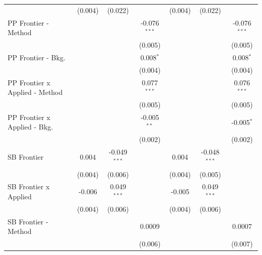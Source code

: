 \begin{tabular}{lcccccc}
                                  & (0.004)        & (0.022)        &                & (0.004)        & (0.022)        &   \\   
   PP Frontier - Method           &                &                & -0.076$^{***}$ &                &                & -0.076$^{***}$\\   
                                  &                &                & (0.005)        &                &                & (0.005)\\   
   PP Frontier - Bkg.             &                &                & 0.008$^{*}$    &                &                & 0.008$^{*}$\\   
                                  &                &                & (0.004)        &                &                & (0.004)\\   
   PP Frontier x Applied - Method &                &                & 0.077$^{***}$  &                &                & 0.076$^{***}$\\   
                                  &                &                & (0.005)        &                &                & (0.005)\\   
   PP Frontier x Applied - Bkg.   &                &                & -0.005$^{**}$  &                &                & -0.005$^{*}$\\   
                                  &                &                & (0.002)        &                &                & (0.002)\\   
   SB Frontier                    & 0.004          & -0.049$^{***}$ &                & 0.004          & -0.048$^{***}$ &   \\   
                                  & (0.004)        & (0.006)        &                & (0.004)        & (0.005)        &   \\   
   SB Frontier x Applied          & -0.006         & 0.049$^{***}$  &                & -0.005         & 0.049$^{***}$  &   \\   
                                  & (0.004)        & (0.006)        &                & (0.004)        & (0.006)        &   \\   
   SB Frontier - Method           &                &                & 0.0009         &                &                & 0.0007\\   
                                  &                &                & (0.006)        &                &                & (0.007)\\   

\end{tabular}
